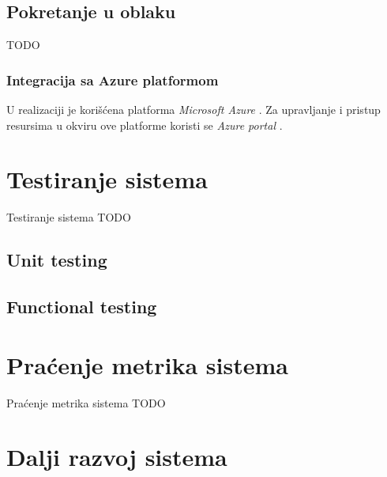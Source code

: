 \documentclass[12pt,oneside]{memoir}
\begin{document}
\section{Pokretanje u oblaku}
TODO

\subsection{Integracija sa Azure platformom}

U realizaciji je korišćena platforma \emph{Microsoft Azure} \cite{Azure}. Za upravljanje i pristup resursima u okviru ove platforme koristi se  \emph{Azure portal} \cite{AzurePortal}.

\chapter{Testiranje sistema}
\label{chp:testiranjesistema}

Testiranje sistema TODO

\section{Unit testing}

\section{Functional testing}

\chapter{Praćenje metrika sistema}
\label{chp:pracenjemetrika}

Praćenje metrika sistema TODO

\chapter{Dalji razvoj sistema}
\label{chp:daljirazvoj}

\end{document}
